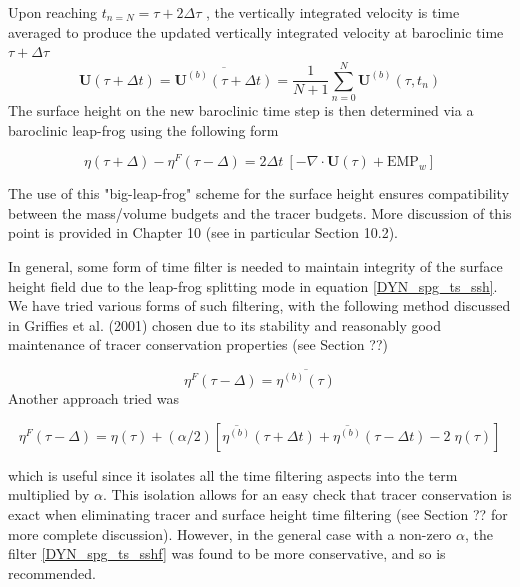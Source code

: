 Upon reaching $t_{n=N} = \tau + 2\Delta \tau$ , the vertically integrated velocity is time averaged to produce the updated vertically integrated velocity at baroclinic time $\tau + \Delta \tau$ 
\begin{equation} \label{DYN_spg_ts_u}
\textbf{U}(\tau+\Delta t) = \overline{\textbf{U}^{(b)}(\tau+\Delta t)} 
 	= \frac{1}{N+1} \sum\limits_{n=0}^N\textbf{U}^{(b)}(\tau,t_{n})
\end{equation}
The surface height on the new baroclinic time step is then determined via a baroclinic leap-frog using the following form 

\begin{equation} \label{DYN_spg_ts_ssh}
\eta(\tau+\Delta) - \eta^{F}(\tau-\Delta) = 2\Delta t \ \left[ - \nabla \cdot \textbf{U}(\tau) + \text{EMP}_w \right]  
\end{equation}

 The use of this "big-leap-frog" scheme for the surface height ensures compatibility between the mass/volume budgets and the tracer budgets. More discussion of this point is provided in Chapter 10 (see in particular Section 10.2). 
 
In general, some form of time filter is needed to maintain integrity of the surface 
height field due to the leap-frog splitting mode in equation \ref{DYN_spg_ts_ssh}. We 
have tried various forms of such filtering, with the following method discussed in 
Griffies et al. (2001) chosen due to its stability and reasonably good maintenance of 
tracer conservation properties (see Section ??) 

\begin{equation} \label{DYN_spg_ts_sshf}
\eta^{F}(\tau-\Delta) =  \overline{\eta^{(b)}(\tau)} 
\end{equation}
Another approach tried was 

\begin{equation} \label{DYN_spg_ts_sshf2}
\eta^{F}(\tau-\Delta) = \eta(\tau) 
	+ (\alpha/2) \left[\overline{\eta^{(b)}}(\tau+\Delta t)
				    + \overline{\eta^{(b)}}(\tau-\Delta t) -2 \;\eta(\tau) \right]
\end{equation}

which is useful since it isolates all the time filtering aspects into the term multiplied 
by $\alpha$. This isolation allows for an easy check that tracer conservation is exact when 
eliminating tracer and surface height time filtering (see Section ?? for more complete discussion). However, in the general case with a non-zero $\alpha$, the filter \ref{DYN_spg_ts_sshf} was found to be more conservative, and so is recommended. 





